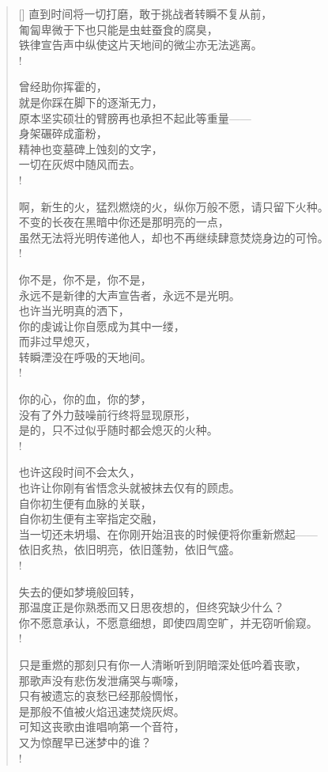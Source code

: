 \documentclass[UTF8, 12pt, a4paper]{ctexrep} %
\begin{document}
\begin{verse}[\versewidth]
直到时间将一切打磨，敢于挑战者转瞬不复从前，\\
匍匐卑微于下也只能是虫蛀蚕食的腐臭，\\
铁律宣告声中纵使这片天地间的微尘亦无法逃离。\\!

曾经助你挥霍的，\\
就是你踩在脚下的逐渐无力，\\
原本坚实硕壮的臂膀再也承担不起此等重量——\\
身架碾碎成齑粉，\\
精神也变墓碑上蚀刻的文字，\\
一切在灰烬中随风而去。\\!

啊，新生的火，猛烈燃烧的火，纵你万般不愿，请只留下火种。\\
不变的长夜在黑暗中你还是那明亮的一点，\\
虽然无法将光明传递他人，却也不再继续肆意焚烧身边的可怜。\\!

你不是，你不是，你不是，\\
永远不是新律的大声宣告者，永远不是光明。\\
也许当光明真的洒下，\\
你的虔诚让你自愿成为其中一缕，\\
而非过早熄灭，\\
转瞬湮没在呼吸的天地间。\\!

你的心，你的血，你的梦，\\
没有了外力鼓噪前行终将显现原形，\\
是的，只不过似乎随时都会熄灭的火种。\\!

也许这段时间不会太久，\\
也许让你刚有省悟念头就被抹去仅有的顾虑。\\
自你初生便有血脉的关联，\\
自你初生便有主宰指定交融，\\
当一切还未坍塌、在你刚开始沮丧的时候便将你重新燃起——\\
依旧炙热，依旧明亮，依旧蓬勃，依旧气盛。\\!

失去的便如梦境般回转，\\
那温度正是你熟悉而又日思夜想的，但终究缺少什么？\\
你不愿意承认，不愿意细想，即使四周空旷，并无窃听偷窥。\\!

只是重燃的那刻只有你一人清晰听到阴暗深处低吟着丧歌，\\
那歌声没有悲伤发泄痛哭与嘶嚎，\\
只有被遗忘的哀愁已经那般惆怅，\\
是那般不值被火焰迅速焚烧灰烬。\\
可知这丧歌由谁唱响第一个音符，\\
又为惊醒早已迷梦中的谁？\\!


\end{verse}
\end{document}
